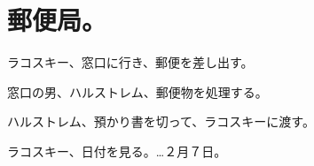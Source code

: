 \section*{郵便局。}

ラコスキー、窓口に行き、郵便を差し出す。

窓口の男、ハルストレム、郵便物を処理する。

ハルストレム、預かり書を切って、ラコスキーに渡す。

ラコスキー、日付を見る。…２月７日。
